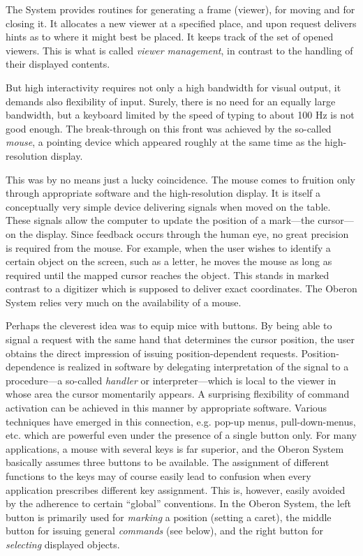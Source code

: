 The System provides routines for generating a frame (viewer), for
moving and for closing it. It allocates a new viewer at a specified
place, and upon request delivers hints as to where it might best be
placed. It keeps track of the set of opened viewers. This is what is
called \emph{viewer management}, in contrast to the handling of their
displayed contents.

But high interactivity requires not only a high bandwidth for visual
output, it demands also flexibility of input. Surely, there is no need
for an equally large bandwidth, but a keyboard limited by the speed of
typing to about 100 Hz is not good enough. The break-through on this
front was achieved by the so-called \emph{mouse}, a pointing device which
appeared roughly at the same time as the high-resolution display.

This was by no means just a lucky coincidence. The mouse comes to
fruition only through appropriate software and the high-resolution
display. It is itself a conceptually very simple device delivering
signals when moved on the table. These signals allow the computer to
update the position of a mark---the cursor---on the display. Since
feedback occurs through the human eye, no great precision is required
from the mouse. For example, when the user wishes to identify a
certain object on the screen, such as a letter, he moves the mouse as
long as required until the mapped cursor reaches the object.
This %
stands in marked contrast to a digitizer which is supposed to deliver
exact coordinates. The Oberon System relies very much on the
availability of a mouse.

Perhaps the cleverest idea was to equip mice with buttons. By being
able to signal a request with the same hand that determines the cursor
position, the user obtains the direct impression of issuing
position-dependent requests. Position-dependence is realized in
software by delegating interpretation of the signal to a procedure---a
so-called \emph{handler} or interpreter---which is local to the viewer in
whose area the cursor momentarily appears. A surprising flexibility of
command activation can be achieved in this manner by appropriate
software. Various techniques have emerged in this connection,
e.g. pop-up menus, pull-down-menus, etc. which are powerful even under
the presence of a single button only. For many applications, a mouse
with several keys is far superior, and the Oberon System basically
assumes three buttons to be available. The assignment of different
functions to the keys may of course easily lead to confusion when
every application prescribes different key assignment. This is,
however, easily avoided by the adherence to certain ``global''
conventions. In the Oberon System, the left button is primarily used
for \emph{marking} a position (setting a caret), the middle button for
issuing general \emph{commands} (see below), and the right button for
\emph{selecting} displayed objects.

